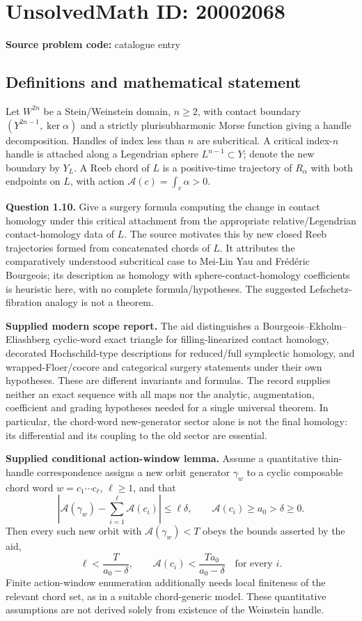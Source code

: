 \documentclass[11pt]{article}
\begin{document}
\section*{UnsolvedMath ID: 20002068}
\textbf{Source problem code:} catalogue entry
\subsection{Definitions and mathematical statement}
Let $W^{2n}$ be a Stein/Weinstein domain, $n\ge2$, with contact boundary $(Y^{2n-1},\ker\alpha)$ and a strictly plurisubharmonic Morse function giving a handle decomposition. Handles of index less than $n$ are subcritical. A critical index-$n$ handle is attached along a Legendrian sphere $L^{n-1}\subset Y$; denote the new boundary by $Y_L$. A Reeb chord of $L$ is a positive-time trajectory of $R_\alpha$ with both endpoints on $L$, with action $\mathcal A(c)=\int_c\alpha>0$.

\textbf{Question 1.10.} Give a surgery formula computing the change in contact homology under this critical attachment from the appropriate relative/Legendrian contact-homology data of $L$. The source motivates this by new closed Reeb trajectories formed from concatenated chords of $L$. It attributes the comparatively understood subcritical case to Mei-Lin Yau and Fr\'ed\'eric Bourgeois; its description as homology with sphere-contact-homology coefficients is heuristic here, with no complete formula/hypotheses. The suggested Lefschetz-fibration analogy is not a theorem.

\textbf{Supplied modern scope report.} The aid distinguishes a Bourgeois--Ekholm--Eliashberg cyclic-word exact triangle for filling-linearized contact homology, decorated Hochschild-type descriptions for reduced/full symplectic homology, and wrapped-Floer/cocore and categorical surgery statements under their own hypotheses. These are different invariants and formulas. The record supplies neither an exact sequence with all maps nor the analytic, augmentation, coefficient and grading hypotheses needed for a single universal theorem. In particular, the chord-word new-generator sector alone is not the final homology: its differential and its coupling to the old sector are essential.

\textbf{Supplied conditional action-window lemma.} Assume a quantitative thin-handle correspondence assigns a new orbit generator $\gamma_w$ to a cyclic composable chord word $w=c_1\cdots c_\ell$, $\ell\ge1$, and that
\[
 \left|\mathcal A(\gamma_w)-\sum_{i=1}^\ell\mathcal A(c_i)\right|
       \le\ell\delta,
 \qquad \mathcal A(c_i)\ge a_0>\delta\ge0.
\]
Then every such new orbit with $\mathcal A(\gamma_w)<T$ obeys the bounds asserted by the aid,
\[
 \ell<\frac{T}{a_0-\delta},\qquad
 \mathcal A(c_i)<\frac{Ta_0}{a_0-\delta}\quad\text{for every }i.
\]
Finite action-window enumeration additionally needs local finiteness of the relevant chord set, as in a suitable chord-generic model. These quantitative assumptions are not derived solely from existence of the Weinstein handle.
\end{document}
